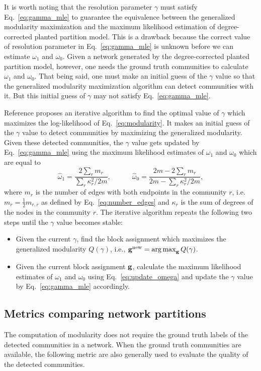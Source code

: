 It is worth noting that the resolution parameter $\gamma$ must satisfy Eq.~\ref{eq:gamma_mle} to guarantee the equivalence between the generalized modularity maximization and the maximum likelihood estimation of degree-corrected planted partition model. This is a drawback because the correct value of resolution parameter in Eq.~\ref{eq:gamma_mle} is unknown before we can estimate $\omega_1$ and $\omega_0$. Given a network generated by the degree-corrected planted partition model, however, one needs the ground truth communities to calculate $\omega_1$ and $\omega_0$. That being said, one must make an initial guess of the $\gamma$ value so that the generalized modularity maximization algorithm can detect communities with it. But this initial guess of $\gamma$ may not satisfy Eq.~\ref{eq:gamma_mle}.

Reference \cite{newman2016equivalence} proposes an iterative algorithm to find the optimal value of $\gamma$ which maximizes the log-likelihood of Eq.~\ref{eq:modularity}. It makes an initial guess of the $\gamma$ value to detect communities by maximizing the generalized modularity. Given these detected communities, the $\gamma$ value gets updated by Eq.~\ref{eq:gamma_mle} using the maximum likelihood estimates of $\omega_1$ and $\omega_0$ which are equal to
\begin{equation} \label{eq:update_omega}
    \hat{\omega}_1 =  \frac{2\sum_r m_r}{\sum_r \kappa_r^2 / 2m}, \quad \quad \quad \hat{\omega}_0 = \frac{2m - 2\sum_r m_r}{2m - \sum_r \kappa_r^2 / 2m},
\end{equation}
where $m_r$ is the number of edges with both endpoints in the community $r$, i.e. $m_r = \frac{1}{2}m_{r,r}$ as defined by Eq.~\ref{eq:number_edges} and $\kappa_r$ is the sum of degrees of the nodes in the community $r$. The iterative algorithm repeats the following two steps until the $\gamma$ value becomes stable:
\begin{itemize}
    \item Given the current $\gamma$, find the block assignment which maximizes the generalized modularity $Q(\gamma)$, i.e., ${\bf g}^{\text{new}} = \operatorname*{arg\,max}_{\bf g} Q(\gamma)$.
    \item Given the current block assignment ${\bf g}$, calculate the maximum likelihood estimates of $\omega_1$ and $\omega_0$ using Eq.~\ref{eq:update_omega} and update the $\gamma$ value by Eq.~\ref{eq:gamma_mle} accordingly.
\end{itemize}

\subsection{Metrics comparing network partitions} \label{sec:2.2.3}
The computation of modularity does not require the ground truth labels of the detected communities in a network. When the ground truth communities are available, the following metric are also generally used to evaluate the quality of the detected communities.

